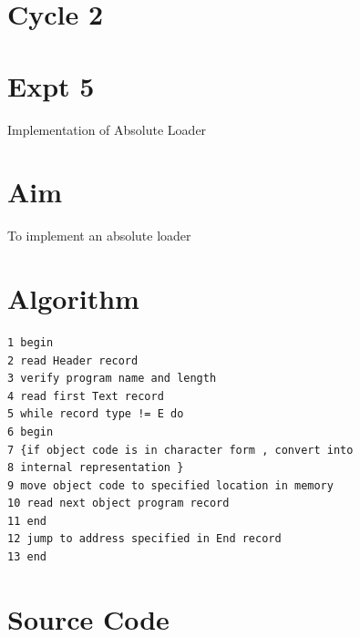\documentclass[13pt,oneside]{book}
\begin{document}
\section*{Cycle 2}
\section*{Expt 5}
\begin{center}
    \Large{Implementation of Absolute Loader}
\end{center}
\section*{Aim}
\large
To implement an absolute loader

\section*{Algorithm} 
    \begin{verbatim}
1 begin
2 read Header record
3 verify program name and length
4 read first Text record
5 while record type != E do
6 begin
7 {if object code is in character form , convert into
8 internal representation }
9 move object code to specified location in memory
10 read next object program record
11 end
12 jump to address specified in End record
13 end
	\end{verbatim}

\section*{Source Code}
\small
\end{document}
